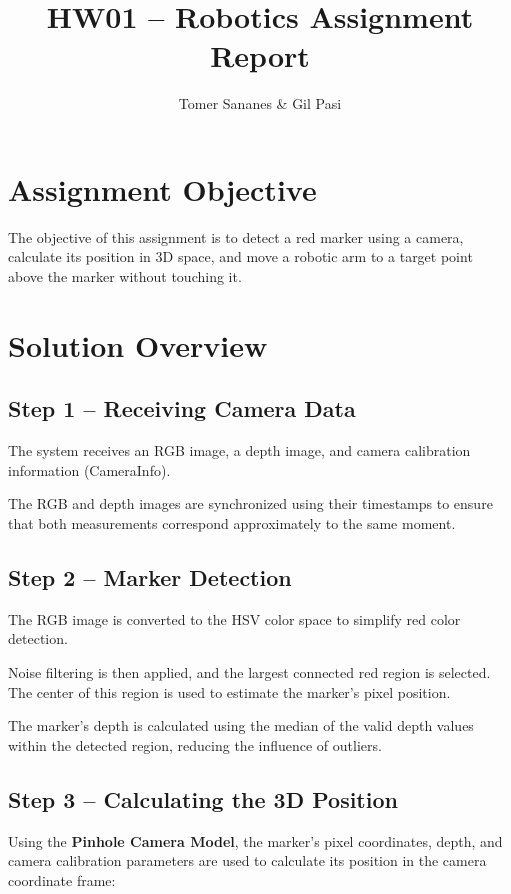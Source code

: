 \documentclass[11pt,a4paper]{article}
\title{HW01 -- Robotics Assignment Report}
\author{Tomer Sananes & Gil Pasi}
\date{}
\begin{document}
\maketitle

\section{Assignment Objective}

The objective of this assignment is to detect a red marker using a camera, calculate its position in 3D space, and move a robotic arm to a target point above the marker without touching it.

\section{Solution Overview}

\subsection{Step 1 -- Receiving Camera Data}

The system receives an RGB image, a depth image, and camera calibration information (CameraInfo).

The RGB and depth images are synchronized using their timestamps to ensure that both measurements correspond approximately to the same moment.

\subsection{Step 2 -- Marker Detection}

The RGB image is converted to the HSV color space to simplify red color detection.

Noise filtering is then applied, and the largest connected red region is selected. The center of this region is used to estimate the marker's pixel position.

The marker's depth is calculated using the median of the valid depth values within the detected region, reducing the influence of outliers.

\subsection{Step 3 -- Calculating the 3D Position}

Using the \textbf{Pinhole Camera Model}, the marker's pixel coordinates, depth, and camera calibration parameters are used to calculate its position in the camera coordinate frame:
\end{document}
